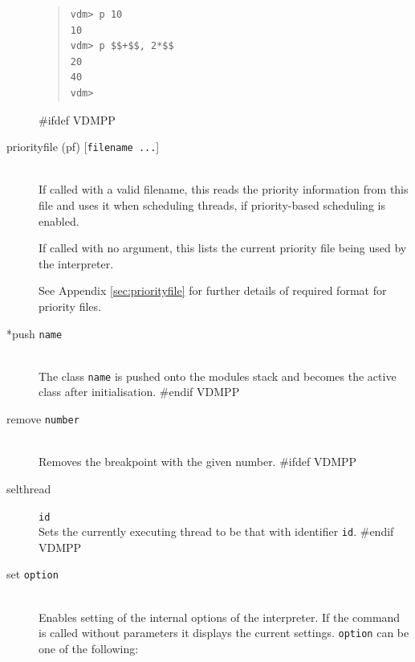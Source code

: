 \documentclass[\pformat,12pt]{article}
\begin{document}
\begin{description}
\begin{quote}
\begin{verbatim}
vdm> p 10
10
vdm> p $$+$$, 2*$$
20
40
vdm> 
\end{verbatim}
\end{quote}

#ifdef VDMPP
\item[priorityfile (pf) \mbox{[{\tt filename ...}]}] \mbox{}\\
  If called with a valid filename, this reads the priority information
  from this file and uses it when scheduling threads, if
  priority-based scheduling is enabled.
  
  If called with no argument, this lists the current priority file being
  used by the interpreter.

  See Appendix \ref{sec:priorityfile} for further details of required
  format for priority files.

\item[*push {\tt name}] \mbox{}\\
  The class {\tt name}\/ is pushed onto the modules stack and becomes
  the active class after initialisation. 
#endif VDMPP

\item[remove \mbox{\texttt{number}}]
\mbox{}\\
  Removes the breakpoint with the given number.
#ifdef VDMPP
\item[selthread]\texttt{id}\mbox{}\\
  Sets the currently executing thread to be that with identifier
  \texttt{id}.
#endif VDMPP

\item[set {\tt option} \ifthenelse{\boolean{VDMsl}}{\mbox{[{\tt
        argument}]}}{}]\mbox{}\\
  Enables setting of the internal options of the interpreter.  If the
  command is called without parameters it displays the current
  settings. {\tt option}\/ can be one of the following:
  

\end{description}
\end{document}
